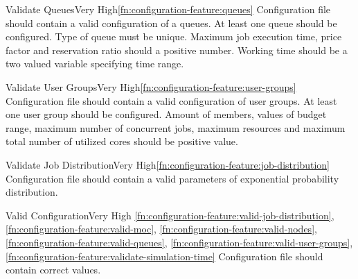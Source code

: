 	\begin{functional}{Validate Queues}{Very High}{\ref{fn:configuration-feature:queues}}
		\label{fn:configuration-feature:valid-queues}
		{
			Configuration file should contain a valid configuration of a queues. At least one queue should be configured.
			Type of queue must be unique. Maximum job execution time, price factor and reservation ratio should a positive number.
			Working time should be a two valued variable specifying time range.
		}
	\end{functional}

	\begin{functional}{Validate User Groups}{Very High}{\ref{fn:configuration-feature:user-groups}}
		\label{fn:configuration-feature:valid-user-groups}
		{
			Configuration file should contain a valid configuration of user groups. At least one user group should be configured. Amount of members, values of budget range, maximum number of concurrent jobs, maximum resources and maximum total number of utilized cores should be positive value.
		}
	\end{functional}

	\begin{functional}{Validate Job Distribution}{Very High}{\ref{fn:configuration-feature:job-distribution}}
		\label{fn:configuration-feature:valid-job-distribution}
		{
			Configuration file should contain a valid parameters of exponential probability distribution.	
		}
	\end{functional}

	\begin{functional}{Valid Configuration}{Very High}
		{
			\ref{fn:configuration-feature:valid-job-distribution},
			\ref{fn:configuration-feature:valid-moc},
			\ref{fn:configuration-feature:valid-nodes},
			\ref{fn:configuration-feature:valid-queues},
			\ref{fn:configuration-feature:valid-user-groups},
			\ref{fn:configuration-feature:validate-simulation-time}
		}
		\label{fn:configuration-feature:valid-configuration}
		{
			Configuration file should contain correct values.
		}
	\end{functional}
	